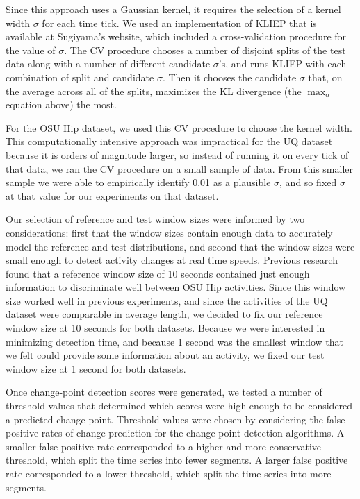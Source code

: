 Since this approach uses a Gaussian kernel, it requires the selection of
a kernel width $\sigma$ for each time tick. We used an implementation of
KLIEP that is available at Sugiyama's website, which included a cross-validation
procedure for the value of $\sigma$. The CV procedure chooses a number of disjoint
splits of the test data along with a number of different candidate $\sigma$'s, and runs
KLIEP with each combination of split and candidate $\sigma$. Then it chooses the candidate $\sigma$
that, on the average across all of the splits, maximizes the KL divergence (the
$\max_{\alpha}$ equation above) the most.

For the OSU Hip dataset, we used this CV procedure to choose the kernel width.
This computationally intensive approach was
impractical for the UQ dataset because it is orders of magnitude larger,
so instead of running it on every tick of that data, we ran the CV procedure on
a small sample of data. From this smaller sample we were able
to empirically identify 0.01 as a plausible $\sigma$, and so fixed $\sigma$
at that value for our experiments on that dataset.

Our selection of reference and test window sizes were informed by two considerations:
first that the window sizes contain enough data to accurately model the
reference and test distributions, and second that the window sizes were small enough
to detect activity changes at real time speeds.
Previous research \cite{zheng12} found that a reference window size of 10
seconds contained just enough information to discriminate well between OSU Hip activities.
Since this window size worked well in previous experiments, and since the 
activities of the UQ dataset were comparable in average length, we decided to
fix our reference window size at 10 seconds for both datasets. Because we were interested in
minimizing detection time, and because 1 second was the smallest window that
we felt could provide some information about an activity, we fixed our test
window size at 1 second for both datasets.

Once change-point detection scores were generated, we tested a number of threshold values that determined which
scores were high enough to be considered a predicted change-point.
Threshold values were chosen by considering the false positive rates of
change prediction for the change-point detection algorithms. A smaller false positive rate
corresponded to a higher and more conservative threshold, which split the
time series into fewer segments. A larger false positive rate
corresponded to a lower threshold, which split the time series into more segments.
